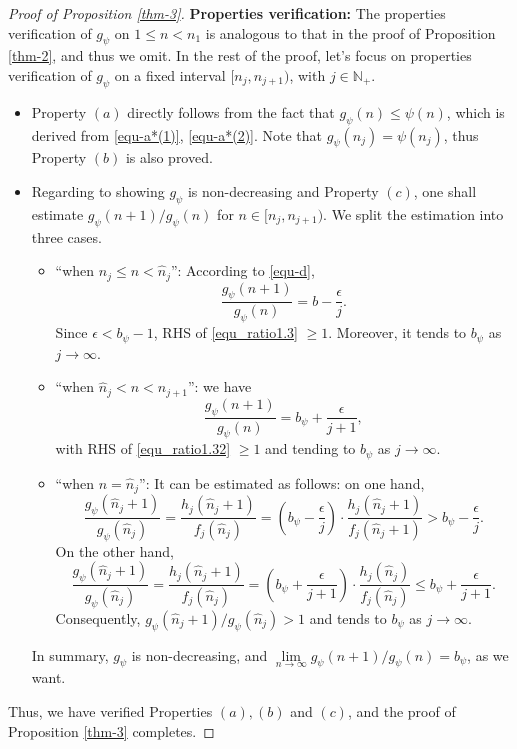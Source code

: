 \documentclass[12pt,reqno]{amsart}
\renewcommand{\=}{\coloneqq}
\theoremstyle{plain}
\begin{document}
\begin{proof}[Proof of Proposition \ref{thm-3}]
\textbf{Properties verification:} The properties verification of $g_{\psi}$ on $1\leq n<n_1$ is analogous to that in the proof of Proposition \ref{thm-2}, and thus we omit. In the rest of the proof, let's focus on properties verification of $g_\psi$ on a fixed interval $[n_j, n_{j+1})$, with $j\in \mathbb{N}_+$.
\begin{itemize}
\item Property $(a)$ directly follows from the fact that $g_\psi(n)\leq \psi(n)$, which is derived from \eqref{equ-a*(1)}, \eqref{equ-a*(2)}. Note that $g_\psi(n_j) = \psi(n_j)$, thus Property $(b)$ is also proved.
\item Regarding to showing $g_{\psi}$ is non-decreasing and Property $(c)$, one shall estimate $g_\psi(n+1)/g_\psi(n)$ for $n\in [n_j, n_{j+1})$. We split the estimation into three cases.
\begin{itemize}
\item ``when $n_j\leq n<\hat{n}_j$'': According to \eqref{equ-d},
\begin{equation}\label{equ_ratio1.3}
\frac{g_\psi(n+1)}{g_\psi(n)} = b-\frac{\epsilon}{j}.
\end{equation}
Since $\epsilon< b_{\psi}-1$, RHS of \eqref{equ_ratio1.3} $\geq 1$. Moreover, it tends to $b_{\psi}$ as $j\to \infty$.
\item ``when $\hat{n}_j < n < n_{j+1}$'': we have
\begin{equation}\label{equ_ratio1.32}
\frac{g_\psi(n+1)}{g_\psi(n)} = b_{\psi}+\frac{\epsilon}{j+1},
\end{equation}
with RHS of \eqref{equ_ratio1.32} $\geq1$ and tending to $b_{\psi}$ as $j\to\infty$.
\item ``when $n = \hat{n}_j$'': It can be estimated as follows: on one hand,
\begin{equation*}
\frac{g_\psi(\hat{n}_j+1)}{g_\psi(\hat{n}_j)} = \frac{h_j(\hat{n}_j+1)}{f_j(\hat{n}_j)} = \left(b_{\psi}-\frac{\epsilon}{j}\right)\cdot \frac{h_j(\hat{n}_j+1)}{f_j(\hat{n}_j+1)} > b_{\psi}-\frac{\epsilon}{j}.
\end{equation*}
On the other hand,
\begin{equation*}
\frac{g_\psi(\hat{n}_j+1)}{g_\psi(\hat{n}_j)} = \frac{h_j(\hat{n}_j+1)}{f_j(\hat{n}_j)} = \left(b_{\psi}+\frac{\epsilon}{j+1}\right)\cdot \frac{h_j(\hat{n}_j)}{f_j(\hat{n}_j)} \leq b_{\psi}+\frac{\epsilon}{j+1}.
\end{equation*}
Consequently, $g_\psi(\hat{n}_j+1)/g_\psi(\hat{n}_j) > 1$ and tends to $b_{\psi}$ as $j\to \infty$.
\end{itemize}
In summary, $g_\psi$ is non-decreasing, and $\lim\limits_{n\to\infty}g_\psi(n+1)/g_\psi(n)=b_{\psi}$, as we want.
\end{itemize}
Thus, we have verified Properties $(a),(b)$ and $(c)$, and the proof of Proposition \ref{thm-3} completes.
\end{proof}
		
\end{document}
